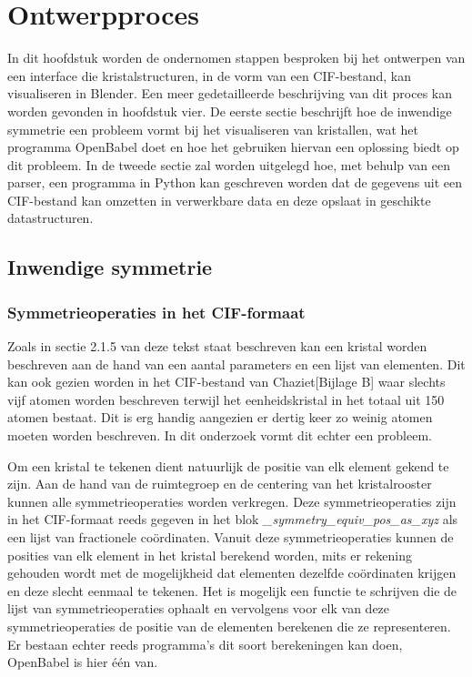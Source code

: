 

\chapter{Ontwerpproces}

In dit hoofdstuk worden de ondernomen stappen besproken bij het ontwerpen van een interface die kristalstructuren, in de vorm van een CIF-bestand, kan visualiseren in Blender. Een meer gedetailleerde beschrijving van dit proces kan worden gevonden in hoofdstuk vier. De eerste sectie beschrijft hoe de inwendige symmetrie een probleem vormt bij het visualiseren van kristallen, wat het programma OpenBabel doet en hoe het gebruiken hiervan een oplossing biedt op dit probleem.
In de tweede sectie zal worden uitgelegd hoe, met behulp van een parser, een programma in Python kan geschreven worden dat de gegevens uit een CIF-bestand kan omzetten in verwerkbare data en deze opslaat in geschikte datastructuren.  


\section{Inwendige symmetrie}

\subsection{Symmetrieoperaties in het CIF-formaat}
Zoals in sectie 2.1.5 van deze tekst staat beschreven kan een kristal worden beschreven aan de hand van een aantal parameters en een lijst van elementen. Dit kan ook gezien worden in het CIF-bestand van Chaziet[Bijlage B] waar slechts vijf atomen worden beschreven terwijl het eenheidskristal in het totaal uit 150 atomen bestaat. Dit is erg handig aangezien er dertig keer zo weinig atomen moeten worden beschreven. In dit onderzoek vormt dit echter een probleem.
\par
Om een kristal te tekenen dient natuurlijk de positie van elk element gekend te zijn. Aan de hand van de ruimtegroep en de centering van het kristalrooster kunnen alle symmetrieoperaties worden verkregen. Deze symmetrieoperaties zijn in het CIF-formaat reeds gegeven in het blok \textit{\_symmetry\_equiv\_pos\_as\_xyz} als een lijst van fractionele coördinaten. Vanuit deze symmetrieoperaties kunnen de posities van elk element in het kristal berekend worden, mits er rekening gehouden wordt met de mogelijkheid dat elementen dezelfde coördinaten krijgen en deze slecht eenmaal te tekenen. Het is mogelijk een functie te schrijven die de lijst van symmetrieoperaties ophaalt en vervolgens voor elk van deze symmetrieoperaties de positie van de elementen berekenen die ze representeren. Er bestaan echter reeds programma's dit soort berekeningen kan doen, OpenBabel is hier één van.
\par
